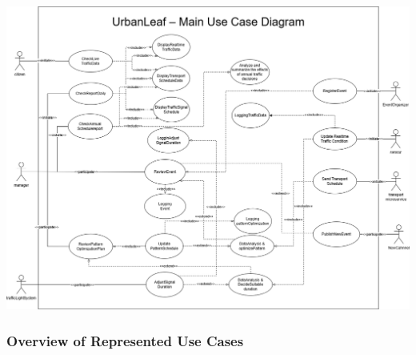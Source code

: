 \vspace{1em}
\begin{center}
    \includegraphics[width=1\textwidth]{Images/UseCase.png}
\end{center}
\vspace{1em}

\subsubsection*{Overview of Represented Use Cases}

